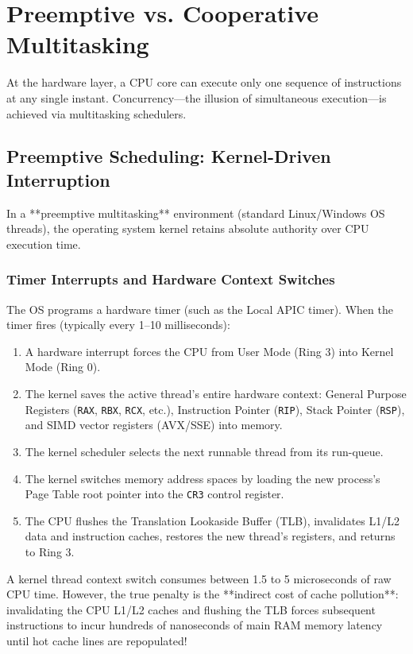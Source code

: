\section{Preemptive vs. Cooperative Multitasking}

At the hardware layer, a CPU core can execute only one sequence of instructions at any single instant. Concurrency—the illusion of simultaneous execution—is achieved via multitasking schedulers.

\subsection{Preemptive Scheduling: Kernel-Driven Interruption}

In a **preemptive multitasking** environment (standard Linux/Windows OS threads), the operating system kernel retains absolute authority over CPU execution time.

\subsubsection{Timer Interrupts and Hardware Context Switches}
The OS programs a hardware timer (such as the Local APIC timer). When the timer fires (typically every 1--10 milliseconds):
\begin{enumerate}[leftmargin=15pt]
  \item A hardware interrupt forces the CPU from User Mode (Ring 3) into Kernel Mode (Ring 0).
  \item The kernel saves the active thread's entire hardware context: General Purpose Registers (\texttt{RAX}, \texttt{RBX}, \texttt{RCX}, etc.), Instruction Pointer (\texttt{RIP}), Stack Pointer (\texttt{RSP}), and SIMD vector registers (AVX/SSE) into memory.
  \item The kernel scheduler selects the next runnable thread from its run-queue.
  \item The kernel switches memory address spaces by loading the new process's Page Table root pointer into the \texttt{CR3} control register.
  \item The CPU flushes the Translation Lookaside Buffer (TLB), invalidates L1/L2 data and instruction caches, restores the new thread's registers, and returns to Ring 3.
\end{enumerate}

\begin{underthehoodbox}
A kernel thread context switch consumes between 1.5 to 5 microseconds of raw CPU time. However, the true penalty is the **indirect cost of cache pollution**: invalidating the CPU L1/L2 caches and flushing the TLB forces subsequent instructions to incur hundreds of nanoseconds of main RAM memory latency until hot cache lines are repopulated!
\end{underthehoodbox}

